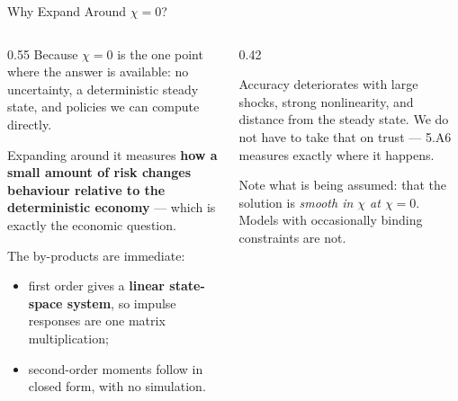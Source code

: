 \begin{frame}{Why Expand Around $\chi=0$?}
\begin{columns}[T]
\begin{column}{0.55\textwidth}
\small
Because $\chi=0$ is the one point where the answer is available: no uncertainty, a deterministic steady state, and policies we can compute directly.
\medskip

Expanding around it measures \textbf{how a small amount of risk changes behaviour relative to the deterministic economy} --- which is exactly the economic question.
\medskip

The by-products are immediate:
\begin{itemize}\small
  \item first order gives a \textbf{linear state-space system}, so impulse responses are one matrix multiplication;
  \item second-order moments follow in closed form, with no simulation.
\end{itemize}
\end{column}
\begin{column}{0.42\textwidth}
\begin{cautionbox}[title=\textbf{And the price}]\small
Accuracy deteriorates with large shocks, strong nonlinearity, and distance from the steady state. We do not have to take that on trust --- 5.A6 measures exactly where it happens.
\end{cautionbox}
\medskip
\begin{examplebox}\footnotesize
Note what is being assumed: that the solution is \emph{smooth in $\chi$ at $\chi=0$}. Models with occasionally binding constraints are not.
\end{examplebox}
\end{column}
\end{columns}
\vspace{1mm}
\end{frame}


